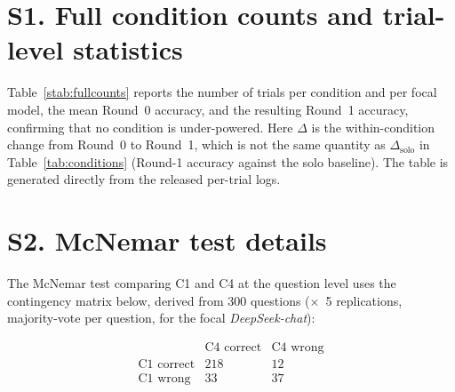 \documentclass[11pt]{article}
\begin{document}
\section*{S1. Full condition counts and trial-level statistics}
\label{ssec:counts}

Table~\ref{stab:fullcounts} reports the number of trials per condition and
per focal model, the mean Round~0 accuracy, and the resulting Round~1
accuracy, confirming that no condition is under-powered.
Here $\Delta$ is the within-condition change from Round~0 to Round~1, which
is not the same quantity as $\Delta_{\mathrm{solo}}$ in
Table~\ref{tab:conditions} (Round-1 accuracy against the solo baseline).
The table is generated directly from the released per-trial logs.



\section*{S2. McNemar test details}
\label{ssec:mcnemar}

The McNemar test comparing C1 and C4 at the question level uses the
contingency matrix below, derived from 300 questions ($\times$~5
replications, majority-vote per question, for the focal
\textit{DeepSeek-chat}):

\[
\begin{array}{l|cc}
                & \text{C4 correct} & \text{C4 wrong} \\
\hline
\text{C1 correct} & 218 & 12 \\
\text{C1 wrong}   & 33  & 37
\end{array}
\]
\end{document}

